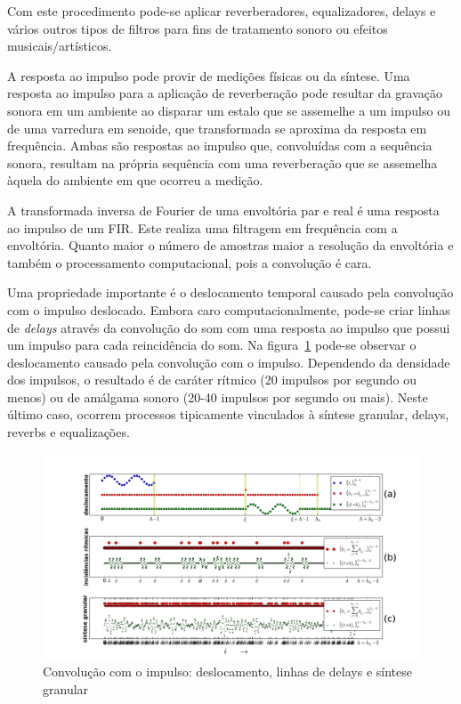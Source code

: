 \begin{itemize}
Com este procedimento pode-se aplicar reverberadores, equalizadores, delays
e vários outros tipos de filtros para fins de tratamento sonoro ou
efeitos musicais/artísticos.
 
A resposta ao impulso pode provir de medições
físicas ou da síntese. Uma resposta 
ao impulso para a aplicação
de reverberação pode resultar da gravação sonora em um ambiente ao disparar
um estalo que se assemelhe a um impulso ou 
de uma varredura em senoide, que transformada se aproxima
da resposta em frequência.
Ambas são respostas ao impulso
que, convoluídas com a sequência sonora, resultam na própria sequência
com uma reverberação que se assemelha àquela do ambiente 
em que ocorreu a medição.\cite{Cook}

A transformada inversa
de Fourier de uma envoltória par e real é uma
resposta ao impulso de um FIR. Este realiza
uma filtragem em frequência com a envoltória.
Quanto maior o número de amostras maior
a resolução da envoltória e também 
o processamento computacional, pois a convolução é cara.

Uma propriedade importante é o deslocamento temporal causado pela convolução com o impulso deslocado. Embora caro computacionalmente, 
pode-se criar linhas de \emph{delays} através da convolução do som com uma resposta ao impulso que possui um impulso
para cada reincidência do som.
Na figura~\ref{fig:delays}
pode-se observar o deslocamento causado pela convolução
com o impulso. Dependendo da densidade dos impulsos, o resultado
é de caráter rítmico (20 impulsos por segundo ou menos) ou de amálgama
sonoro (20-40 impulsos por segundo ou mais). Neste último caso,
ocorrem processos tipicamente vinculados à síntese granular, delays, reverbs e equalizações.

\begin{figure}[h!]
    \centering
        \includegraphics[width=\textwidth]{figuras/delays__}
    \caption{Convolução com o impulso: deslocamento, linhas de delays e síntese granular}
        \label{fig:delays}
\end{figure}



\end{itemize}
